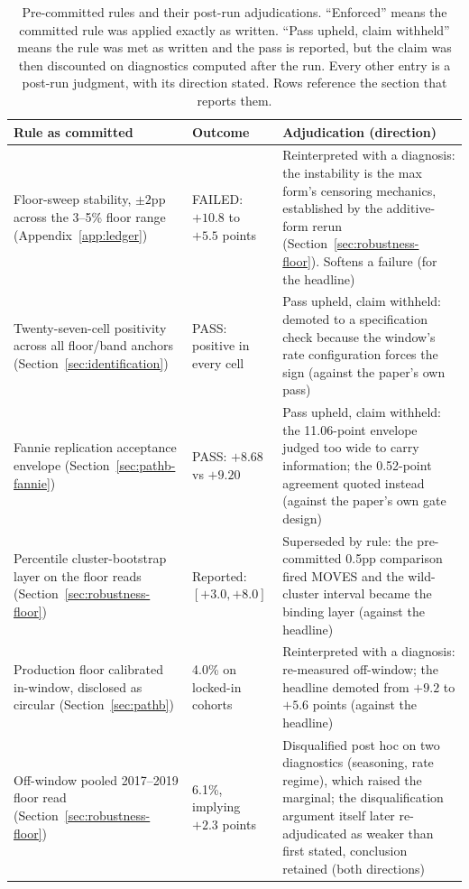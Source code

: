 \documentclass[12pt]{article}
\begin{document}
\begin{table}[H]
\centering
\caption{Pre-committed rules and their post-run adjudications. ``Enforced'' means the committed rule was applied exactly as written. ``Pass upheld, claim withheld'' means the rule was met as written and the pass is reported, but the claim was then discounted on diagnostics computed after the run. Every other entry is a post-run judgment, with its direction stated. Rows reference the section that reports them.}
\label{tab:verdicts}
\scriptsize
\begin{threeparttable}
\begin{tabular}{@{}p{4.4cm}p{4.2cm}p{5.6cm}@{}}
\toprule
Rule as committed & Outcome & Adjudication (direction) \\
\midrule
Floor-sweep stability, $\pm 2$pp across the 3--5\% floor range (Appendix~\ref{app:ledger}) & FAILED: $+10.8$ to $+5.5$ points & Reinterpreted with a diagnosis: the instability is the max form's censoring mechanics, established by the additive-form rerun (Section~\ref{sec:robustness-floor}). Softens a failure (for the headline) \\
Twenty-seven-cell positivity across all floor/band anchors (Section~\ref{sec:identification}) & PASS: positive in every cell & Pass upheld, claim withheld: demoted to a specification check because the window's rate configuration forces the sign (against the paper's own pass) \\
Fannie replication acceptance envelope (Section~\ref{sec:pathb-fannie}) & PASS: $+8.68$ vs $+9.20$ & Pass upheld, claim withheld: the 11.06-point envelope judged too wide to carry information; the 0.52-point agreement quoted instead (against the paper's own gate design) \\
Percentile cluster-bootstrap layer on the floor reads (Section~\ref{sec:robustness-floor}) & Reported: $[+3.0, +8.0]$ & Superseded by rule: the pre-committed 0.5pp comparison fired MOVES and the wild-cluster interval became the binding layer (against the headline) \\
Production floor calibrated in-window, disclosed as circular (Section~\ref{sec:pathb}) & 4.0\% on locked-in cohorts & Reinterpreted with a diagnosis: re-measured off-window; the headline demoted from $+9.2$ to $+5.6$ points (against the headline) \\
Off-window pooled 2017--2019 floor read (Section~\ref{sec:robustness-floor}) & 6.1\%, implying $+2.3$ points & Disqualified post hoc on two diagnostics (seasoning, rate regime), which raised the marginal; the disqualification argument itself later re-adjudicated as weaker than first stated, conclusion retained (both directions) \\

\end{tabular}
\end{threeparttable}
\end{table}
\end{document}
